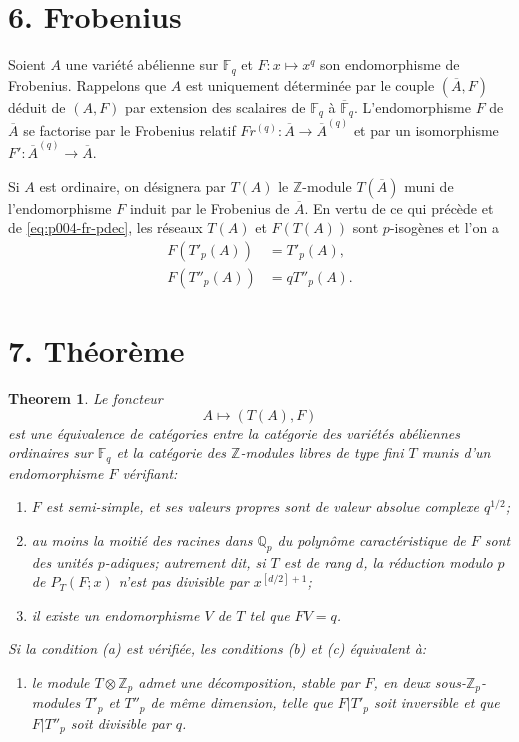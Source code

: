 \documentclass[12pt]{article}
\newcommand{\Z}{\mathbb{Z}}
\newcommand{\Q}{\mathbb{Q}}
\newcommand{\F}{\mathbb{F}}
\theoremstyle{plain}
\newtheorem{theorem}{Theorem}
\theoremstyle{definition}
\theoremstyle{remark}
\begin{document}
\section*{6. Frobenius}
Soient $A$ une variété abélienne sur $\F_q$ et $F:x\mapsto x^q$ son endomorphisme de Frobenius. Rappelons que $A$ est uniquement déterminée par le couple $(\overline A,F)$ déduit de $(A,F)$ par extension des scalaires de $\F_q$ à $\overline{\F}_q$. L'endomorphisme $F$ de $\overline A$ se factorise par le Frobenius relatif $Fr^{(q)}:\overline A\to\overline A^{(q)}$ et par un isomorphisme $F':\overline A^{(q)}\to\overline A$.

Si $A$ est ordinaire, on désignera par $T(A)$ le $\Z$-module $T(\overline A)$ muni de l'endomorphisme $F$ induit par le Frobenius de $\overline A$. En vertu de ce qui précède et de \eqref{eq:p004-fr-pdec}, les réseaux $T(A)$ et $F(T(A))$ sont $p$-isogènes et l'on a
\begin{align}
 F(T'_p(A))&=T'_p(A),\label{eq:p004-fr-61}\\
 F(T''_p(A))&=qT''_p(A).\label{eq:p004-fr-62}
\end{align}

\section*{7. Théorème}
\begin{theorem}
Le foncteur
\[
 A\longmapsto (T(A),F)
\]
est une équivalence de catégories entre la catégorie des variétés abéliennes ordinaires sur $\F_q$ et la catégorie des $\Z$-modules libres de type fini $T$ munis d'un endomorphisme $F$ vérifiant:
\begin{enumerate}[label=(\alph*)]
\item $F$ est semi-simple, et ses valeurs propres sont de valeur absolue complexe $q^{1/2}$;
\item au moins la moitié des racines dans $\Q_p$ du polynôme caractéristique de $F$ sont des unités $p$-adiques; autrement dit, si $T$ est de rang $d$, la réduction modulo $p$ de $P_T(F;x)$ n'est pas divisible par $x^{[d/2]+1}$;
\item il existe un endomorphisme $V$ de $T$ tel que $FV=q$.
\end{enumerate}
Si la condition (a) est vérifiée, les conditions (b) et (c) équivalent à:
\begin{enumerate}[label=(\alph*),start=4]
\item le module $T\otimes\Z_p$ admet une décomposition, stable par $F$, en deux sous-$\Z_p$-modules $T'_p$ et $T''_p$ de même dimension, telle que $F|T'_p$ soit inversible et que $F|T''_p$ soit divisible par $q$.
\end{enumerate}
\end{theorem}
\end{document}
